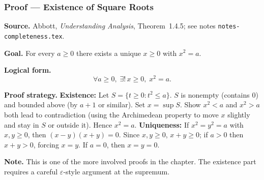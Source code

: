 
\clearpage
{}
\hypertarget{proof-RA-ABB-P-sqrt-existence}{}

\subsubsection[Existence of Square Roots]{Proof --- Existence of Square Roots}

\bigskip

\noindent
\textbf{Source.}
Abbott, \emph{Understanding Analysis}, Theorem~1.4.5; see notes
\texttt{notes-completeness.tex}.

\vspace{0.75em}

\noindent
\textbf{Goal.}
For every $a \ge 0$ there exists a unique $x \ge 0$ with $x^2 = a$.

\vspace{0.75em}

\noindent
\textbf{Logical form.}
\[
  \forall a \ge 0,\; \exists!\, x \ge 0,\; x^2 = a.
\]

\vspace{0.75em}

\noindent
\textbf{Proof strategy.}
\textbf{Existence:} Let $S = \{t \ge 0 : t^2 \le a\}$. $S$ is nonempty
(contains $0$) and bounded above (by $a + 1$ or similar). Set $x = \sup S$.
Show $x^2 < a$ and $x^2 > a$ both lead to contradiction (using the
Archimedean property to move $x$ slightly and stay in $S$ or outside it).
Hence $x^2 = a$.
\textbf{Uniqueness:} If $x^2 = y^2 = a$ with $x, y \ge 0$, then
$(x-y)(x+y) = 0$. Since $x,y \ge 0$, $x + y \ge 0$; if $a > 0$ then
$x + y > 0$, forcing $x = y$. If $a = 0$, then $x = y = 0$.

\vspace{0.75em}

\noindent
\textbf{Note.}
This is one of the more involved proofs in the chapter. The existence part
requires a careful $\varepsilon$-style argument at the supremum.

\vspace{0.75em}

